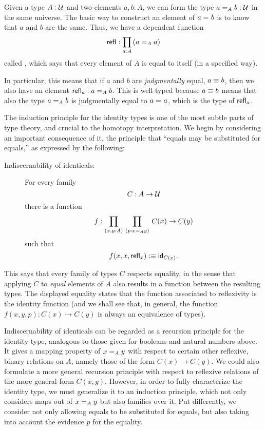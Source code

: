 Given a type $A:\UU$ and two elements $a,b:A$, we can form the type $\id[A]{a}{b}:\UU$ in the same universe.
The basic way to construct an element of $\id{a}{b}$ is to know that $a$ and $b$ are the same.
Thus, we have a dependent function
\[\refl{} : \prd{a:A} (\id[A]{a}{a})\]
called ,
%
which says that every element of $A$ is equal to itself (in a specified way).

In particular, this means that if $a$ and $b$ are \emph{judgmentally} equal, $a\jdeq b$, then we also have an element $\refl{a} : \id[A]{a}{b}$.
This is well-typed because $a\jdeq b$ means that also the type $\id[A]{a}{b}$ is judgmentally equal to $\id{a}{a}$, which is the type of $\refl{a}$.

The induction principle for the identity types is one of the most subtle parts of type theory, and crucial to the homotopy interpretation.
We begin by considering an important consequence of it, the principle that ``equals may be substituted for equals,'' as expressed by the following:
%
%
\begin{description}
\item[Indiscernability of identicals:]
For every family 
\[
C : A \to \UU
\]
there is a function
\[
f : \prd{x,y:A}{p:\id[A] x y} C(x) \to C(y)
\]
such that
\[
f(x,x,\refl{x}) \defeq \idfunc[C(x)].
\]
\end{description}
This says that every family of types $C$ respects equality, in the sense that applying $C$ to \emph{equal} elements of $A$ also results in a function between the resulting types. The displayed equality states that the function associated to reflexivity is the identity function (and we shall see that, in general, the function $f(x,y,p): C(x) \to C(y)$ is always an equivalence of types).

Indiscernability of identicals can be regarded as a recursion principle for the identity type, analogous to those given for booleans and natural numbers above.  It gives a mapping property of $\id[A] x y$ with respect to certain other reflexive, binary relations on $A$, namely those of the form $C(x) \to C(y)$.  We could also formulate a more general recursion principle with respect to reflexive relations of the more general form $C(x,y)$.  However, 
in order to fully characterize the identity type, we must generalize it to an induction principle, which not only considers maps out of $\id[A] x y$ but also families over it.   Put differently, we consider not only allowing equals to be substituted for equals, but also taking into account the evidence $p$ for the equality.  
    
